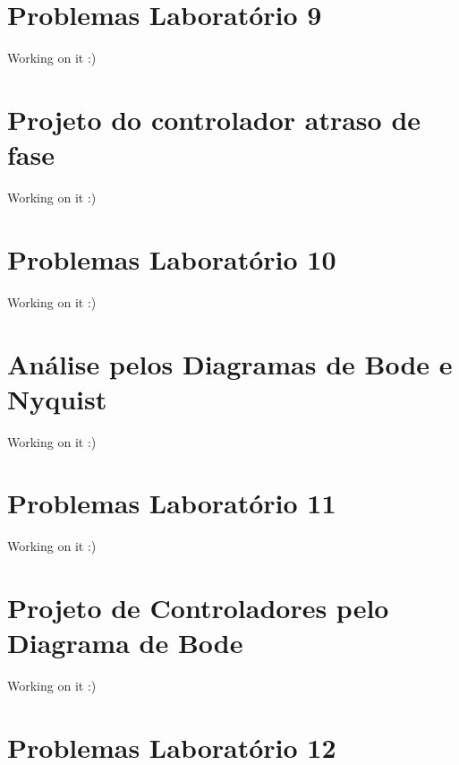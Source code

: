 \documentclass[
]{book}
\theoremstyle{definition}
\theoremstyle{definition}
\theoremstyle{definition}
\theoremstyle{remark}
\begin{document}
\hypertarget{problemas-laboratuxf3rio-9}{%
\chapter*{Problemas Laboratório 9}\label{problemas-laboratuxf3rio-9}}

Working on it :)

\hypertarget{projeto-do-controlador-atraso-de-fase}{%
\chapter{Projeto do controlador atraso de fase}\label{projeto-do-controlador-atraso-de-fase}}

Working on it :)

\hypertarget{problemas-laboratuxf3rio-10}{%
\chapter*{Problemas Laboratório 10}\label{problemas-laboratuxf3rio-10}}

Working on it :)

\hypertarget{anuxe1lise-pelos-diagramas-de-bode-e-nyquist}{%
\chapter{Análise pelos Diagramas de Bode e Nyquist}\label{anuxe1lise-pelos-diagramas-de-bode-e-nyquist}}

Working on it :)

\hypertarget{problemas-laboratuxf3rio-11}{%
\chapter*{Problemas Laboratório 11}\label{problemas-laboratuxf3rio-11}}

Working on it :)

\hypertarget{projeto-de-controladores-pelo-diagrama-de-bode}{%
\chapter{Projeto de Controladores pelo Diagrama de Bode}\label{projeto-de-controladores-pelo-diagrama-de-bode}}

Working on it :)

\hypertarget{problemas-laboratuxf3rio-12}{%
\chapter*{Problemas Laboratório 12}\label{problemas-laboratuxf3rio-12}}
\end{document}
